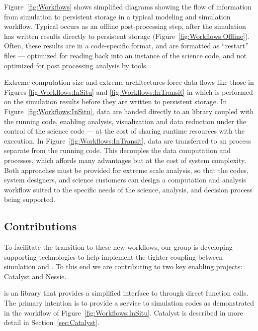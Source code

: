 Figure~\ref{fig:Workflows} shows simplified diagrams showing the flow of
information from simulation to persistent storage in a typical modeling and
simulation workflow.  Typical \vda occurs as an offline post-processing
step, after the simulation has written results directly to persistent
storage (Figure~\ref{fig:Workflows:Offline}).  Often, these results are in
a code-specific format, and are formatted as ``restart'' files ---
optimized for reading back into an instance of the science code, and not
optimized for post processing analysis by \vda tools.

Extreme computation size and extreme architectures force data flows like
those in Figures \ref{fig:Workflows:InSitu} and
\ref{fig:Workflows:InTransit} in which \vda is performed on the simulation
results before they are written to persistent storage.  In
Figure~\ref{fig:Workflows:InSitu}, data are handed directly to an
 \vda library coupled with the running code,
enabling analysis, visualization and data reduction under the control of
the science code --- at the cost of sharing runtime resources with the \vda
execution.  In Figure~\ref{fig:Workflows:InTransit}, data are transferred
to an \keyterm{\intransit} \vda process separate from the running code.
This decouples the data computation and \vda processes, which affords many
advantages but at the cost of system complexity.  Both approaches must be
provided for extreme scale analysis, so that the codes, system designers,
and science customers can design a computation and analysis workflow suited
to the specific needs of the science, analysis, and decision process being
supported.

\subsection{Contributions}

To facilitate the transition to these new workflows, our group is
developing supporting technologies to help implement the tighter coupling
between simulation and \vda.  To this end we are contributing to two key
enabling projects: Catalyst and Nessie.

 is an \insitu library that provides a simplified
interface to \vda through direct function calls.  The primary intention is
to provide a \vda service to simulation codes as demonstrated in the
workflow of Figure~\ref{fig:Workflows:InSitu}.  Catalyst is described in
more detail in Section~\ref{sec:Catalyst}.

